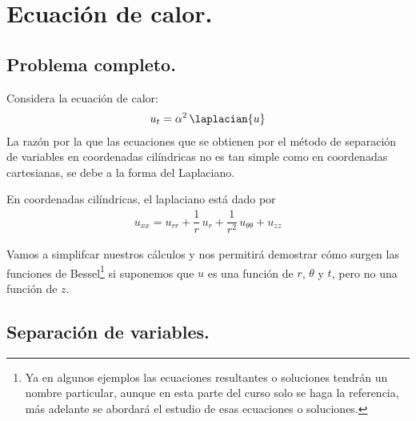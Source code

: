 \section{Ecuación de calor.}
\subsection{Problema completo.}
Considera la ecuación de calor:
\begin{align*}
u_{t} =  \alpha^{2} \,  \laplacian{u}
\end{align*}
La razón por la que las ecuaciones que se obtienen por el método de separación de variables en coordenadas cilíndricas no es tan simple como en coordenadas cartesianas, se debe a la forma del Laplaciano. 

En coordenadas cilíndricas, el laplaciano está dado por
\begin{align*}
u_{xx} = u_{rr} + \dfrac{1}{r} \, u_{r} + \dfrac{1}{r^{2}} \, u_{\theta \theta} + u_{zz}
\end{align*}

Vamos a simplifcar nuestros cálculos y nos permitirá demostrar cómo surgen las funciones de Bessel\footnote{Ya en algunos ejemplos las ecuaciones resultantes o soluciones tendrán un nombre particular, aunque en esta parte del curso solo se haga la referencia, más adelante se abordará el estudio de esas ecuaciones o soluciones.} si suponemos que $u$ es una función de $r$, $\theta$ y $t$, pero no una función de $z$.

\subsection{Separación de variables.}

